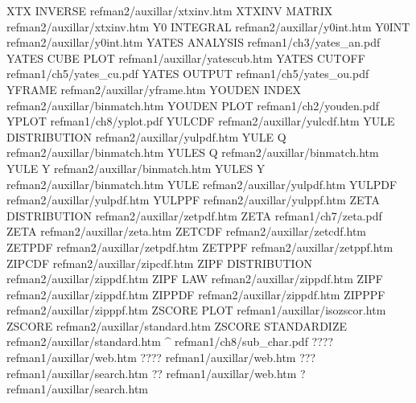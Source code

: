 XTX INVERSE                             refman2/auxillar/xtxinv.htm
XTXINV MATRIX                           refman2/auxillar/xtxinv.htm
Y0 INTEGRAL                             refman2/auxillar/y0int.htm
Y0INT                                   refman2/auxillar/y0int.htm
YATES ANALYSIS                          refman1/ch3/yates_an.pdf
YATES CUBE PLOT                         refman1/auxillar/yatescub.htm
YATES CUTOFF                            refman1/ch5/yates_cu.pdf
YATES OUTPUT                            refman1/ch5/yates_ou.pdf
YFRAME                                  refman2/auxillar/yframe.htm
YOUDEN INDEX                            refman2/auxillar/binmatch.htm
YOUDEN PLOT                             refman1/ch2/youden.pdf
YPLOT                                   refman1/ch8/yplot.pdf
YULCDF                                  refman2/auxillar/yulcdf.htm
YULE DISTRIBUTION                       refman2/auxillar/yulpdf.htm
YULE Q                                  refman2/auxillar/binmatch.htm
YULES Q                                 refman2/auxillar/binmatch.htm
YULE Y                                  refman2/auxillar/binmatch.htm
YULES Y                                 refman2/auxillar/binmatch.htm
YULE                                    refman2/auxillar/yulpdf.htm
YULPDF                                  refman2/auxillar/yulpdf.htm
YULPPF                                  refman2/auxillar/yulppf.htm
ZETA DISTRIBUTION                       refman2/auxillar/zetpdf.htm
ZETA                                    refman1/ch7/zeta.pdf
ZETA                                    refman2/auxillar/zeta.htm
ZETCDF                                  refman2/auxillar/zetcdf.htm
ZETPDF                                  refman2/auxillar/zetpdf.htm
ZETPPF                                  refman2/auxillar/zetppf.htm
ZIPCDF                                  refman2/auxillar/zipcdf.htm
ZIPF DISTRIBUTION                       refman2/auxillar/zippdf.htm
ZIPF LAW                                refman2/auxillar/zippdf.htm
ZIPF                                    refman2/auxillar/zippdf.htm
ZIPPDF                                  refman2/auxillar/zippdf.htm
ZIPPPF                                  refman2/auxillar/zipppf.htm
ZSCORE PLOT                             refman1/auxillar/isozscor.htm
ZSCORE                                  refman2/auxillar/standard.htm
ZSCORE STANDARDIZE                      refman2/auxillar/standard.htm
^                                       refman1/ch8/sub_char.pdf
????                                    refman1/auxillar/web.htm
????                                    refman1/auxillar/web.htm
???                                     refman1/auxillar/search.htm
??                                      refman1/auxillar/web.htm
?                                       refman1/auxillar/search.htm
